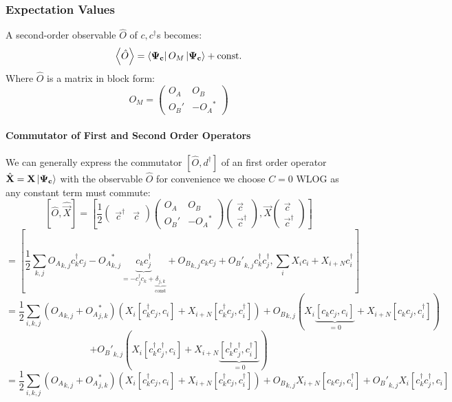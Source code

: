 \documentclass[Master]{subfiles}
\begin{document}
\subsubsection{Expectation Values}\label{bdg:Expectationvalues}
A second-order observable $\hat{O}$ of $c,c^{\dag}$s  becomes:
 $$ \left<\hat{O}\right> = \bra{\mathbf{\Psi_c}}O_M\ket{\mathbf{\Psi_c}}  + \text{const.} $$
Where $\hat{O}$ is a matrix in block form:
 $$
O_M= 
\left(
\begin{array}{c|c}
   O_A  &  O_B \\
   \hline 
   O_B' &  -{O_A}^*
\end{array}\right)
$$
\paragraph{Commutator of First and Second Order Operators} \label{sec:CommutatorLemma}
 We can generally express the commutator $[\hat{O},d^{\dag}]$ of an first order operator $\hat{\vec{X}} = \Vec{X}\ket{\vec{\Psi_c}}$  with the observable $\hat{O}$ for convenience we choose $C = 0 $ WLOG  as any constant term must commute:
 $$ [\hat{O},\hat{\vec{X}}] = 
 [
\frac{1}{2}
\left(
\begin{array}{c|c}
\vec{c}^{\dag} & \vec{c} 
\end{array}
\right)
\left(
\begin{array}{c|c}
O_A & {O_B} \\
\hline
O_B' & -{O_A}^*
\end{array}
\right)
\left(
\begin{array}{c}
\vec{c} \\
\hline
\vec{c}^{\dag}
\end{array}
\right)
, \vec{X}\left(
\begin{array}{c}
\vec{c} \\
\hline
\vec{c}^{\dag}
\end{array}
\right)]
$$
$$=[
\frac{1}{2}
\sum_{k,j} 
{O_A}_{k,j} c^{\dag}_k c_j 
- {O_A}^*_{k,j} \underbrace{c_k c^{\dag}_j}_{ = - c^{\dag}_{j} c_k + \underbrace{\delta_{j,k}}_{\text{const}}}
+  {O_B}_{k,j} c_k c_j
+ {O_B'}_{k,j} c^{\dag}_k c^{\dag}_j 
,
\sum_i X_i c_i + X_{i+N} c^{\dag}_i
]
$$
$$
= 
\frac{1}{2}
\sum_{i,k,j}
({O_A}_{k,j} + {O_A}^*_{j,k}) \left(X_i[c^{\dag}_k c_j,c_i]+X_{i+N}[c^{\dag}_k c_j,c^{\dag}_i]\right)
+ {O_B}_{k,j} (X_i\underbrace{[c_k c_j,c_i]}_{=0}+X_{i+N}[c_k c_j,c^{\dag}_i])
$$
$$
+ {O_B'}_{k,j} (X_i[c_k^{\dag} c_j^{\dag},c_i]+X_{i+N}\underbrace{[c_k^{\dag} c_j^{\dag},c^{\dag}_i]}_{=0})
$$
$$
= 
\frac{1}{2}
\sum_{i,k,j}
({O_A}_{k,j} + {O_A}^*_{j,k})\left(X_i[c^{\dag}_k c_j,c_i]+X_{i+N}[c^{\dag}_k c_j,c^{\dag}_i]\right)
+ {O_B}_{k,j} X_{i+N}[c_k c_j,c^{\dag}_i]
+ {O_B'}_{k,j} X_i[c_k^{\dag} c_j^{\dag},c_i]
$$
\end{document}
